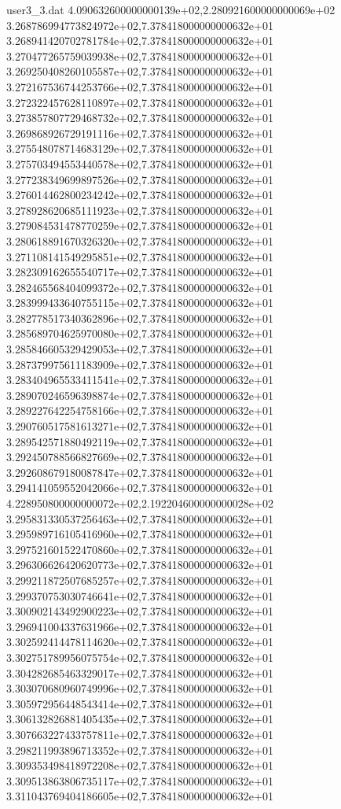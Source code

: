 \begin{filecontents}{user3_3.dat}
4.090632600000000139e+02,2.280921600000000069e+02
3.268786994773824972e+02,7.378418000000000632e+01
3.268941420702781784e+02,7.378418000000000632e+01
3.270477265759039938e+02,7.378418000000000632e+01
3.269250408260105587e+02,7.378418000000000632e+01
3.272167536744253766e+02,7.378418000000000632e+01
3.272322457628110897e+02,7.378418000000000632e+01
3.273857807729468732e+02,7.378418000000000632e+01
3.269868926729191116e+02,7.378418000000000632e+01
3.275548078714683129e+02,7.378418000000000632e+01
3.275703494553440578e+02,7.378418000000000632e+01
3.277238349699897526e+02,7.378418000000000632e+01
3.276014462800234242e+02,7.378418000000000632e+01
3.278928620685111923e+02,7.378418000000000632e+01
3.279084531478770259e+02,7.378418000000000632e+01
3.280618891670326320e+02,7.378418000000000632e+01
3.271108141549295851e+02,7.378418000000000632e+01
3.282309162655540717e+02,7.378418000000000632e+01
3.282465568404099372e+02,7.378418000000000632e+01
3.283999433640755115e+02,7.378418000000000632e+01
3.282778517340362896e+02,7.378418000000000632e+01
3.285689704625970080e+02,7.378418000000000632e+01
3.285846605329429053e+02,7.378418000000000632e+01
3.287379975611183909e+02,7.378418000000000632e+01
3.283404965533411541e+02,7.378418000000000632e+01
3.289070246596398874e+02,7.378418000000000632e+01
3.289227642254758166e+02,7.378418000000000632e+01
3.290760517581613271e+02,7.378418000000000632e+01
3.289542571880492119e+02,7.378418000000000632e+01
3.292450788566827669e+02,7.378418000000000632e+01
3.292608679180087847e+02,7.378418000000000632e+01
3.294141059552042066e+02,7.378418000000000632e+01
4.228950800000000072e+02,2.192204600000000028e+02
3.295831330537256463e+02,7.378418000000000632e+01
3.295989716105416960e+02,7.378418000000000632e+01
3.297521601522470860e+02,7.378418000000000632e+01
3.296306626420620773e+02,7.378418000000000632e+01
3.299211872507685257e+02,7.378418000000000632e+01
3.299370753030746641e+02,7.378418000000000632e+01
3.300902143492900223e+02,7.378418000000000632e+01
3.296941004337631966e+02,7.378418000000000632e+01
3.302592414478114620e+02,7.378418000000000632e+01
3.302751789956075754e+02,7.378418000000000632e+01
3.304282685463329017e+02,7.378418000000000632e+01
3.303070680960749996e+02,7.378418000000000632e+01
3.305972956448543414e+02,7.378418000000000632e+01
3.306132826881405435e+02,7.378418000000000632e+01
3.307663227433757811e+02,7.378418000000000632e+01
3.298211993896713352e+02,7.378418000000000632e+01
3.309353498418972208e+02,7.378418000000000632e+01
3.309513863806735117e+02,7.378418000000000632e+01
3.311043769404186605e+02,7.378418000000000632e+01

\end{filecontents}
